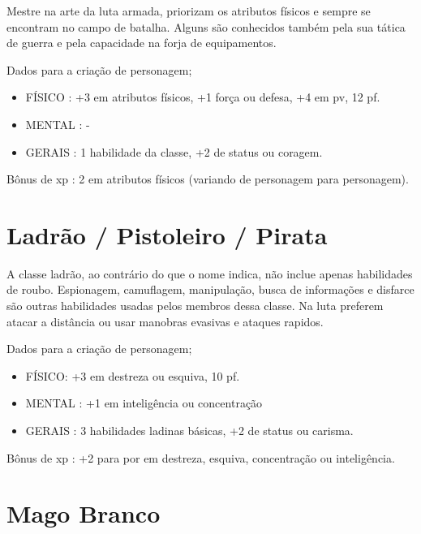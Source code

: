 Mestre na arte da luta armada, priorizam os atributos físicos e sempre se encontram no campo de batalha. Alguns são conhecidos também pela sua tática de guerra e pela capacidade na forja de equipamentos. 

Dados para a criação de personagem;

\begin{itemize}


	\item FÍSICO : +3 em atributos físicos, +1 força ou defesa, +4 em pv, 12 pf.

	\item MENTAL : -

	\item GERAIS : 1 habilidade da classe, +2 de status ou coragem.

\end{itemize}

Bônus de xp : 2 em atributos físicos (variando de personagem para personagem).

\section{Ladrão / Pistoleiro / Pirata}

A classe ladrão, ao contrário do que o nome indica, não inclue apenas habilidades de roubo. Espionagem, camuflagem, manipulação, busca de informações e disfarce são outras habilidades usadas pelos membros dessa classe. Na luta preferem atacar a distância ou usar manobras evasivas e ataques rapidos.

Dados para a criação de personagem;

\begin{itemize}


	\item FÍSICO:  +3 em destreza ou esquiva, 10 pf.  

	\item MENTAL : +1 em inteligência ou concentração 

	\item GERAIS : 3 habilidades ladinas básicas, +2 de status ou carisma.

\end{itemize}

Bônus de xp : +2 para por em destreza, esquiva, concentração ou inteligência.

\section{Mago Branco}

